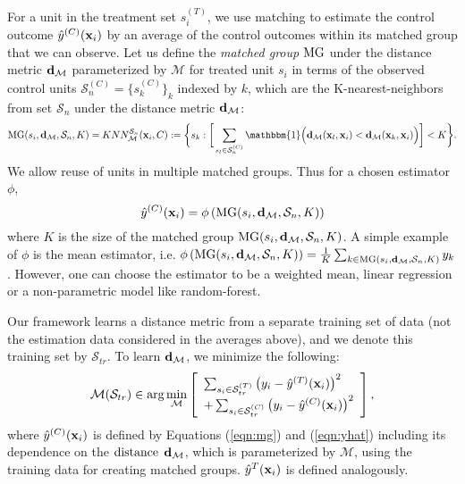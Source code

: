  For a unit in the treatment set $s^{(T)}_i$, we use matching to estimate the control outcome $\hat{y}^{(C)}(\mathbf{x}_i)$ by an average of the control outcomes within its matched group that we can observe. Let us define the \textit{matched group} $\mathrm{MG}$ under the distance metric $\mathbf{d}_{\mathcal{M}}$ parameterized by $\mathcal{M}$ for treated unit $s_i$ in terms of the observed control units $\mathcal{S}^{(C)}_n = \{s_k^{(C)}\}_{k}$ indexed by $k$, which are the K-nearest-neighbors from set $\mathcal{S}_n$ under the distance metric $\mathbf{d}_{\mathcal{M}}$:
\begin{eqnarray}\label{eqn:mg}
\MG(s_i,\dis_{\mathcal{M}},\mathcal{S}_n,K) =
KNN^{\mathcal{S}_n}_{\mathcal{M}}(\x_i,C) := %
\bigg\{s_k:\bigg[\sum_{s_l\in\mathcal{S}^{(C)}_n}\mathbbm{1}\Big(\dis_{\mathcal{M}}(
\x_l,\x_i)<\dis_{\mathcal{M}}(\x_k,\x_i)\Big)\bigg] < K \bigg\}.
\end{eqnarray}
We allow reuse of units in multiple matched groups. Thus for a chosen estimator $\phi$,
\begin{equation}\label{eqn:yhat}
\hat{y}^{(C)}(\mathbf{x}_i) = \phi\left(\mathrm{MG}(s_i,\mathbf{d}_{\mathcal{M}},\mathcal{S}_n,K)\right)
\end{equation}
where $K$ is the size of the matched group $\mathrm{MG}(s_i,\mathbf{d}_{\mathcal{M}},\mathcal{S}_n,K)$. A simple example of $\phi$ is the mean estimator, i.e. $\phi\left(\mathrm{MG}(s_i,\mathbf{d}_{\mathcal{M}},\mathcal{S}_n,K)\right) =  \frac{1}{K}\sum_{k\in\mathrm{MG}(s_i,\mathbf{d}_{\mathcal{M}},\mathcal{S}_n,K)}y_k$. However, one can choose the estimator to be a weighted mean, linear regression or a non-parametric model like random-forest. 

Our framework learns a distance metric
from a separate training set of data (not the estimation data considered in the averages above), and
we denote this training set by $\mathcal{S}_{tr}$. To learn $\mathbf{d}_{\mathcal{M}}$, we minimize the following:
\begin{eqnarray*}
\mathcal{M}(\mathcal{S}_{tr})\in
\textrm{arg}\min_{\mathcal{M}}\left[ 
\begin{array}{l}
\sum_{s_i\in \mathcal{S}^{(T)}_{tr}}
\left( y_i - \hat{y}^{(T)}(\mathbf{x}_i)
\right)^2 \\
+ \sum_{s_i\in \mathcal{S}^{(C)}_{tr}}
\left( y_i - \hat{y}^{(C)}(\mathbf{x}_i)
\right)^2\end{array}
\right],  
\end{eqnarray*}
where $\hat{y}^{(C)}(\mathbf{x}_i)$ is defined by Equations (\ref{eqn:mg}) and (\ref{eqn:yhat}) including its dependence on the $\mathrm{distance}$ $\mathbf{d}_{\mathcal{M}}$, which is parameterized by
 $\mathcal{M}$,
using the training data for creating matched groups. $\hat{y}^{T}(\mathbf{x}_i)$ is defined analogously.

